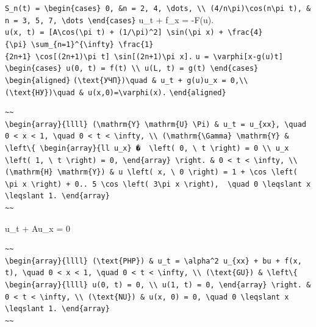 \documentclass[
  ukrainian,
]{article}
\begin{document}
\texttt{S\_n(t)\ =\ \textbackslash{}begin\{cases\}\ 0,\ \&n\ =\ 2,\ 4,\ \textbackslash{}dots,\ \textbackslash{}\textbackslash{}\ (4/n\textbackslash{}pi)\textbackslash{}cos(n\textbackslash{}pi\ t),\ \&n\ =\ 3,\ 5,\ 7,\ \textbackslash{}dots\ \textbackslash{}end\{cases\}}
u\_t + f\_x = -F(u).
\texttt{u(x,\ t)\ =\ {[}A\textbackslash{}cos(\textbackslash{}pi\ t)\ +\ (1/\textbackslash{}pi)\^{}2{]}\ \textbackslash{}sin(\textbackslash{}pi\ x)\ +\ \textbackslash{}frac\{4\}\{\textbackslash{}pi\}\ \textbackslash{}sum\_\{n=1\}\^{}\{\textbackslash{}infty\}\ \textbackslash{}frac\{1\}\{2n+1\}\ \textbackslash{}cos{[}(2n+1)\textbackslash{}pi\ t{]}\ \textbackslash{}sin{[}(2n+1)\textbackslash{}pi\ x{]}.}
\texttt{u\ =\ \textbackslash{}varphi{[}x-g(u)t{]}}
\texttt{\textbackslash{}begin\{cases\}\ u(0,\ t)\ =\ f(t)\ \textbackslash{}\textbackslash{}\ u(L,\ t)\ =\ g(t)\ \textbackslash{}end\{cases\}}
\texttt{\textbackslash{}begin\{aligned\}}
\texttt{(\textbackslash{}text\{УЧП\})\textbackslash{}quad\ \&\ u\_t\ +\ g(u)u\_x\ =\ 0,\textbackslash{}\textbackslash{}}
\texttt{(\textbackslash{}text\{НУ\})\textbackslash{}quad\ \&\ u(x,0)=\textbackslash{}varphi(x).}
\texttt{\textbackslash{}end\{aligned\}}

\begin{verbatim}
~~
\begin{array}{llll} (\mathrm{Y} \mathrm{U} \Pi) & u_t = u_{xx}, \quad 0 < x < 1, \quad 0 < t < \infty, \\ (\mathrm{\Gamma} \mathrm{Y} & \left\{ \begin{array}{ll u_x} �  \left( 0, \ t \right) = 0 \\ u_x \left( 1, \ t \right) = 0, \end{array} \right. & 0 < t < \infty, \\ (\mathrm{H} \mathrm{Y}) & u \left( x, \ 0 \right) = 1 + \cos \left( \pi x \right) + 0.. 5 \cos \left( 3\pi x \right),  \quad 0 \leqslant x \leqslant 1. \end{array}
~~
\end{verbatim}

u\_t + Au\_x = 0

\begin{verbatim}
~~
\begin{array}{llll} (\text{PHP}) & u_t = \alpha^2 u_{xx} + bu + f(x, t), \quad 0 < x < 1, \quad 0 < t < \infty, \\ (\text{GU}) & \left\{ \begin{array}{llll} u(0, t) = 0, \\ u(1, t) = 0, \end{array} \right. & 0 < t < \infty, \\ (\text{NU}) & u(x, 0) = 0, \quad 0 \leqslant x \leqslant 1. \end{array}
~~
\end{verbatim}
\end{document}
